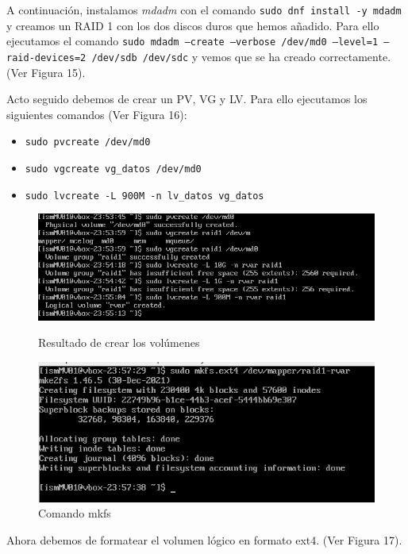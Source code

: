 A continuación, instalamos \textit{mdadm} con el comando \texttt{sudo dnf install -y mdadm} y creamos un RAID 1 con los dos discos duros que hemos añadido. Para ello ejecutamos el comando \texttt{sudo mdadm --create --verbose /dev/md0 --level=1 --raid-devices=2 /dev/sdb /dev/sdc} y vemos que se ha creado correctamente. (Ver Figura 15).

Acto seguido debemos de crear un PV, VG y LV. Para ello ejecutamos los siguientes comandos (Ver Figura 16):
\begin{itemize}
  \item \texttt{sudo pvcreate /dev/md0}
  \item \texttt{sudo vgcreate vg\_datos /dev/md0}
  \item \texttt{sudo lvcreate -L 900M -n lv\_datos vg\_datos}
\end{itemize}

\begin{figure}[htbp]
  \centering
  \begin{minipage}[b]{0.45\textwidth}
      \centering
      \includegraphics[width=\textwidth]{images/Bloque1/create.png}
      \caption{Resultado de crear los volúmenes}
  \end{minipage}
  \hfill
  \begin{minipage}[b]{0.45\textwidth}
      \centering
      \includegraphics[width=\textwidth]{images/Bloque1/mkfs.png}
      \caption{Comando mkfs}
  \end{minipage}
\end{figure}

Ahora debemos de formatear el volumen lógico en formato ext4. (Ver Figura 17).

